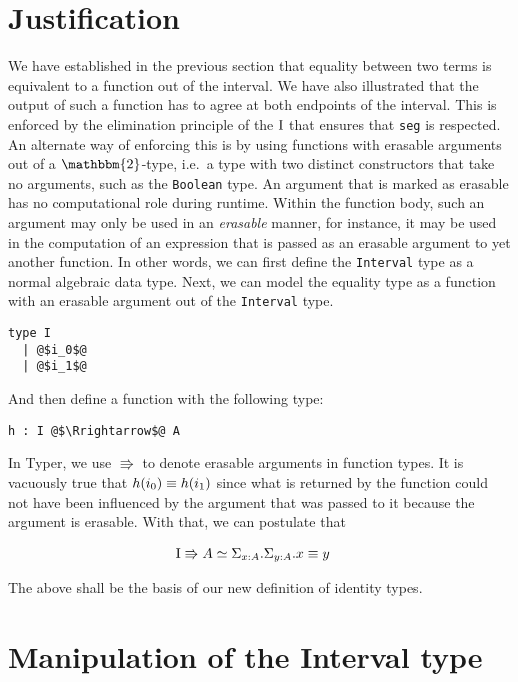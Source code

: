 \documentclass[12pt,twoside,maitrise]{dms}
\theoremstyle{definition}
\numberwithin{equation}{section}
\numberwithin{table}{chapter}
\numberwithin{figure}{chapter}
\newcommand\id[1] {\texttt{#1}}
\begin{document}
\section{Justification}\label{sec:eq-justification}
We have established in the previous section that equality between two terms is
equivalent to a function out of the interval. We have also illustrated that the
output of such a function has to agree at both endpoints of the interval. This
is enforced by the elimination principle of the $\mathrm{I}$ that ensures that \id{seg}
is respected. An alternate way of enforcing this is by using functions with
erasable arguments out of a $\mathbbm{2}$-type, i.e.\ a type with two distinct
constructors that take no arguments, such as the \id{Boolean} type. An argument
that is marked as erasable has no computational role during runtime. Within the
function body, such an argument may only be used in an \emph{erasable} manner,
for instance, it may be used in the computation of an expression that is passed
as an erasable argument to yet another function. In other words, we can first
define the \id{Interval} type as a normal algebraic data type. Next, we can
model the equality type as a function with an erasable argument out of the
\id{Interval} type.

\begin{verbatim}
type I
  | @$i_0$@
  | @$i_1$@
\end{verbatim}

And then define a function with the following type:

\begin{verbatim}
h : I @$\Rrightarrow$@ A
\end{verbatim}

In Typer, we use $\Rrightarrow$ to denote erasable arguments in function types.
It is vacuously true that $\eqtype{h(i_0)}{h(i_1)}$ since what is returned by
the function could not have been influenced by the argument that was passed to
it because the argument is erasable. With that, we can postulate that

\begin{align*}
  & \bI \Rrightarrow A \simeq \Sigma_{\oftype{x}{A}} . \Sigma_{\oftype{y}{A}} .
  \eqtype{x}{y}
\end{align*}

The above shall be the basis of our new definition of identity types.

\section{Manipulation of the Interval type}
\end{document}
